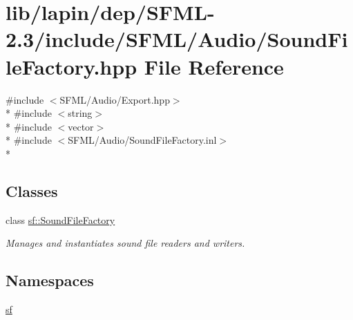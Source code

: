 \hypertarget{lapin_2dep_2_s_f_m_l-2_83_2include_2_s_f_m_l_2_audio_2_sound_file_factory_8hpp}{\section{lib/lapin/dep/\-S\-F\-M\-L-\/2.3/include/\-S\-F\-M\-L/\-Audio/\-Sound\-File\-Factory.hpp File Reference}
\label{lapin_2dep_2_s_f_m_l-2_83_2include_2_s_f_m_l_2_audio_2_sound_file_factory_8hpp}
}
{\ttfamily \#include $<$S\-F\-M\-L/\-Audio/\-Export.\-hpp$>$}\\*
{\ttfamily \#include $<$string$>$}\\*
{\ttfamily \#include $<$vector$>$}\\*
{\ttfamily \#include $<$S\-F\-M\-L/\-Audio/\-Sound\-File\-Factory.\-inl$>$}\\*
\subsection*{Classes}
\begin{DoxyCompactItemize}
\item 
class \hyperlink{classsf_1_1_sound_file_factory}{sf\-::\-Sound\-File\-Factory}
\begin{DoxyCompactList}\small\item\em Manages and instantiates sound file readers and writers. \end{DoxyCompactList}\end{DoxyCompactItemize}
\subsection*{Namespaces}
\begin{DoxyCompactItemize}
\item 
\hyperlink{namespacesf}{sf}
\end{DoxyCompactItemize}
